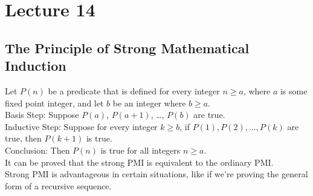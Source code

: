 \documentclass{report}
\begin{document}

\section{Lecture 14}
\subsection*{The Principle of Strong Mathematical Induction}
Let $P(n)$ be a predicate that is defined for every integer $n\geq a$, where $a$ is some fixed point integer, and let $b$ be an integer where $b\geq a$. \\ 

Basis Step: Suppose $P(a)$, $P(a+1)$, \dots, $P(b)$ are true. \\
Inductive Step: Suppose for every integer $k\geq b$, if $P(1), P(2),\dots, P(k)$ are true, then $P(k+1)$ is true.\\
Conclusion: Then $P(n)$ is true for all integers $n\geq a$. \\

\Claim It can be proved that the strong PMI is equivalent to the ordinary PMI. \\
Strong PMI is advantageous in certain situations, like if we're proving the general form of a recursive sequence.
\end{document}
